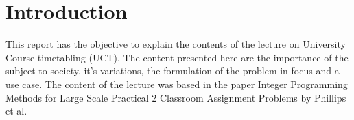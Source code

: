 \section{Introduction}

This report has the objective to explain the contents of the lecture on University Course timetabling (UCT). The content presented here are the importance of the subject to society, it's variations, the formulation of the problem in focus and a use case. The content of the lecture was based in the paper Integer Programming Methods for Large Scale Practical
2 Classroom Assignment Problems by Phillips et al.

